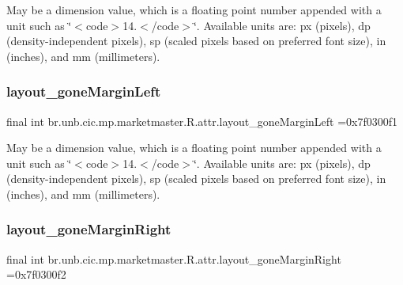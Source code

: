 May be a dimension value, which is a floating point number appended with a unit such as \char`\"{}$<$code$>$14.\+5sp$<$/code$>$\char`\"{}. Available units are\+: px (pixels), dp (density-\/independent pixels), sp (scaled pixels based on preferred font size), in (inches), and mm (millimeters). \mbox{\label{classbr_1_1unb_1_1cic_1_1mp_1_1marketmaster_1_1R_1_1attr_a12259df7ab170c308de82e4dc9470e42}} 
\subsubsection{\texorpdfstring{layout\+\_\+gone\+Margin\+Left}{layout\_goneMarginLeft}}
{\footnotesize\ttfamily final int br.\+unb.\+cic.\+mp.\+marketmaster.\+R.\+attr.\+layout\+\_\+gone\+Margin\+Left =0x7f0300f1\hspace{0.3cm}{\ttfamily [static]}}

May be a dimension value, which is a floating point number appended with a unit such as \char`\"{}$<$code$>$14.\+5sp$<$/code$>$\char`\"{}. Available units are\+: px (pixels), dp (density-\/independent pixels), sp (scaled pixels based on preferred font size), in (inches), and mm (millimeters). \mbox{\label{classbr_1_1unb_1_1cic_1_1mp_1_1marketmaster_1_1R_1_1attr_a63a046abc58908d36bb00125aa9e7fe6}} 
\subsubsection{\texorpdfstring{layout\+\_\+gone\+Margin\+Right}{layout\_goneMarginRight}}
{\footnotesize\ttfamily final int br.\+unb.\+cic.\+mp.\+marketmaster.\+R.\+attr.\+layout\+\_\+gone\+Margin\+Right =0x7f0300f2\hspace{0.3cm}{\ttfamily [static]}}

